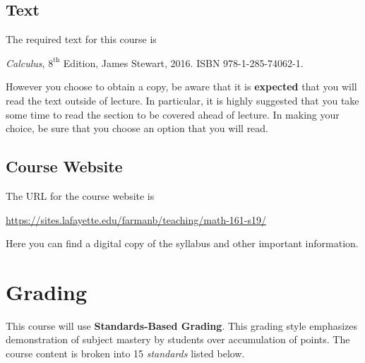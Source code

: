 \documentclass[12pt]{amsart}
\def\courseWebsite{https://sites.lafayette.edu/farmanb/teaching/math-161-s19/}
\begin{document}
\subsection*{Text}
The required text for this course is
\begin{center}
  {\it Calculus}, $8^{\text{th}}$ Edition, James Stewart, 2016. ISBN 978-1-285-74062-1.
\end{center}

\noindent
However you choose to obtain a copy, be aware that it is {\bf expected} that you will read the text outside of lecture.
In particular, it is highly suggested that you take some time to read the section to be covered ahead of lecture.
In making your choice, be sure that you choose an option that you will read.

\subsection*{Course Website} The URL for the course website is
\begin{center}
  \url{\courseWebsite}
\end{center}
Here you can find a digital copy of the syllabus and other important information.\\

\section*{Grading}
This course will use \textbf{Standards-Based Grading}.
This grading style emphasizes demonstration of subject mastery by students over accumulation of points.
The course content is broken into 15 \textit{standards} listed below.
\end{document}
